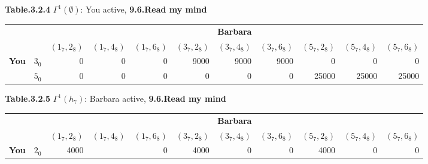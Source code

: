 \documentclass{article}
\begin{document}
\begin{description}
\begin{center}
        {\bf Table.3.2.4 }$\Gamma ^1(\emptyset )$: You active, {\bf 9.6.Read my mind}
    \end{center}

    \begin{center}
        \begin{tabular}{rrrrrrrrrrr}
        \hline
        \hline
                   &            &                                                                                 \multicolumn{ 9}{c}{{\bf Barbara}} \\

                   &            &  $(1_7,2_8)$ &  $(1_7,4_8)$ &  $(1_7,6_8)$ &  $(3_7,2_8)$ &  $(3_7,4_8)$ &  $(3_7,6_8)$ &  $(5_7,2_8)$ &  $(5_7,4_8)$ &  $(5_7,6_8)$ \\
        \hline
        \multicolumn{ 1}{c}{{\bf You}} &        $3_0$ &          0 &          0 &          0 &       9000 &       9000 &       9000 &          0 &          0 &          0 \\

        \multicolumn{ 1}{c}{{\bf }} &        $5_0$ &          0 &          0 &          0 &          0 &          0 &          0 &      25000 &      25000 &      25000 \\
        \hline
        \hline
        \end{tabular}

        {\bf Table.3.2.5 }$\Gamma ^1(h_7)$: Barbara active, {\bf 9.6.Read my mind}
    \end{center}

    \begin{center}
        \begin{tabular}{rrrrrrrrrrr}
        \hline
        \hline
                   &            &                                                                                 \multicolumn{ 9}{c}{{\bf Barbara}} \\

                   &            &  $(1_7,2_8)$ &  $(1_7,4_8)$ &  $(1_7,6_8)$ &  $(3_7,2_8)$ &  $(3_7,4_8)$ &  $(3_7,6_8)$ &  $(5_7,2_8)$ &  $(5_7,4_8)$ &  $(5_7,6_8)$ \\
        \hline
        \multicolumn{ 1}{c}{{\bf You}} &        $2_0$ &       4000 &            &          0 &       4000 &          0 &          0 &       4000 &          0 &          0 \\


\end{tabular}
\end{center}
\end{description}
\end{document}
